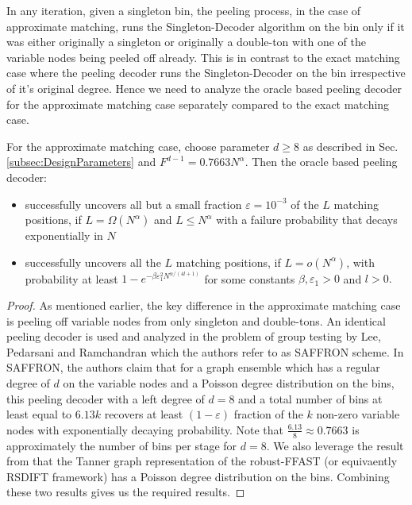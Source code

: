 In any iteration, given a singleton bin, the peeling process, in the case of approximate matching, runs the Singleton-Decoder algorithm on the bin only if it was either originally a singleton or originally a double-ton with one of the variable nodes being peeled off already. This is in contrast to the exact matching case where the peeling decoder runs the Singleton-Decoder on the bin irrespective of it's original degree. Hence we need to analyze the oracle based peeling decoder for the approximate matching case separately compared to the exact matching case.
\begin{lemma}
For the approximate matching case, choose parameter $d\geq 8$ as described in Sec. \ref{subsec:DesignParameters} and $F^{d-1}=0.7663 N^{\alpha}$. Then the oracle based peeling decoder: %
\begin{itemize}
\item successfully uncovers all but a small fraction $\varepsilon=10^{-3}$ of the $L$ matching positions, if $L=\Omega(N^{\alpha})$ and $L\leq N^{\alpha}$ with a failure probability that decays exponentially in $N$
\item successfully uncovers all the $L$ matching positions, if $L=o(N^{\alpha})$, with probability at least $1-e^{-\beta \varepsilon_1^2N^{\alpha/(4l+1)}}$ for some constants $\beta,\varepsilon_1>0$ and $l>0.$
\end{itemize}\label{Lem:peeling_approximate}
\end{lemma}
\begin{proof}
As mentioned earlier, the key difference in the approximate matching case is peeling off variable nodes from only singleton and double-tons. An identical peeling decoder is used and analyzed in the problem of group testing \cite{lee2015saffron} by Lee, Pedarsani and Ramchandran which the authors refer to as SAFFRON scheme. In SAFFRON, the authors claim that for a graph ensemble which has a regular degree of $d$ on the variable nodes and a  Poisson degree distribution on the bins, this peeling decoder with a left degree of $d=8$ and a total number of bins at least equal to $6.13 k$ recovers at least $(1-\varepsilon)$ fraction of the $k$ non-zero variable nodes with exponentially decaying probability. Note that $\frac{6.13}{8}\approx 0.7663$ is approximately the number of bins per stage for $d=8$. We also leverage the result from \cite{pawar2014robust} that the Tanner graph representation of the robust-FFAST (or equivaently RSDIFT framework) has a Poisson degree distribution on the bins. Combining these two results gives us the required results.
\end{proof}

